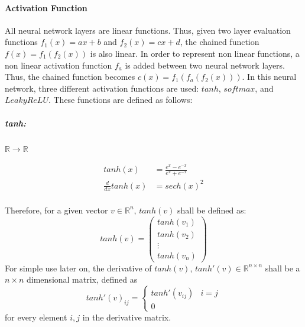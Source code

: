 \documentclass[12pt]{article}
\begin{document}
\paragraph{Activation Function}
All neural network layers are linear functions. Thus, given two layer evaluation functions \(f_1(x) = ax + b\) and \(f_2(x) = cx + d\), the chained function \(f(x) = f_1(f_2(x))\) is also linear.
In order to represent non linear functions, a non linear activation function \(f_a\) is added between two neural network layers. Thus, the chained function becomes \(c(x) = f_1(f_a(f_2(x)))\). In this neural network, three different activation functions are used: \(tanh\), \(softmax\), and \(LeakyReLU\). These functions are defined as follows:
\subparagraph*{tanh:}\(\mathbb{R}\to \mathbb{R}\)

\begin{center}

\end{center}

\begin{align} \label{eq:NN:tanh}
tanh(x) &= \frac{e^x-e^{-x}}{e^x+e^{-x}}\\
\label{eq:NN:tanh_derivative}
\frac{d}{dx}tanh(x) &= sech(x)^2
\end{align}\\
Therefore, for a given vector \(v \in \mathbb R^n\), \(tanh(v)\) shall be defined as:
\begin{equation}\label{eq:vecTanh}
tanh(v) = \left(
\begin{matrix}
tanh(v_1)\\
tanh(v_2)\\
\vdots\\
tanh(v_n)
\end{matrix}
\right)
\end{equation}
For simple use later on, the derivative of \(tanh(v)\), \(tanh'(v) \in \mathbb R^{n \times n}\) shall be a \(n \times n\) dimensional matrix, defined as
\begin{equation}
tanh'(v)_{ij} = \left\{\begin{matrix}
tanh'(v_{ij}) & i = j \\
0
\end{matrix}\right.
\end{equation}
for every element \(i,j\) in the derivative matrix.
\end{document}

